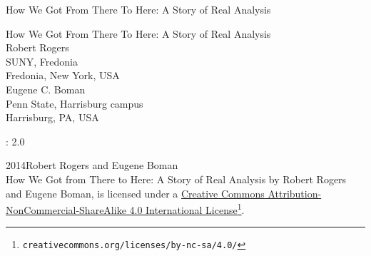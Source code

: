 \documentclass[oneside,10pt,]{book}
\newcommand{\titlepagefont}{\relax}
\numberwithin{equation}{section}
\begin{document}
\raggedbottom
\frontmatter
\thispagestyle{empty}
{\titlepagefont\centering
\vspace*{0.28\textheight}
{\Huge How We Got From There To Here: A Story of Real Analysis}\\}
\clearpage
\thispagestyle{empty}
{\titlepagefont\centering
\vspace*{0.14\textheight}
{\Huge How We Got From There To Here: A Story of Real Analysis}\\[3\baselineskip]
{\Large Robert Rogers}\\[0.5\baselineskip]
{\Large SUNY, Fredonia\\
Fredonia, New York, USA}\\[3\baselineskip]
{\Large Eugene C. Boman}\\[0.5\baselineskip]
{\Large Penn State, Harrisburg campus\\
Harrisburg, PA, USA}\\}
\clearpage
\thispagestyle{empty}
\hypertarget{x:colophon:FrontColophon}{}
: 2.0\par\medskip
\noindent\textcopyright{}2014\quad{}Robert Rogers and Eugene Boman\\[0.5\baselineskip]
How We Got from There to Here: A Story of Real Analysis by Robert Rogers and Eugene Boman, is licensed under a \href{http://creativecommons.org/licenses/by-nc-sa/4.0/}{Creative Commons Attribution-NonCommercial-ShareAlike 4.0 International License}\footnote{\nolinkurl{creativecommons.org/licenses/by-nc-sa/4.0/}\label{g:fn:idp1}}.\par\medskip
{}
\null\clearpage
%
%
\typeout{************************************************}
\typeout{************************************************}
%
\end{document}
